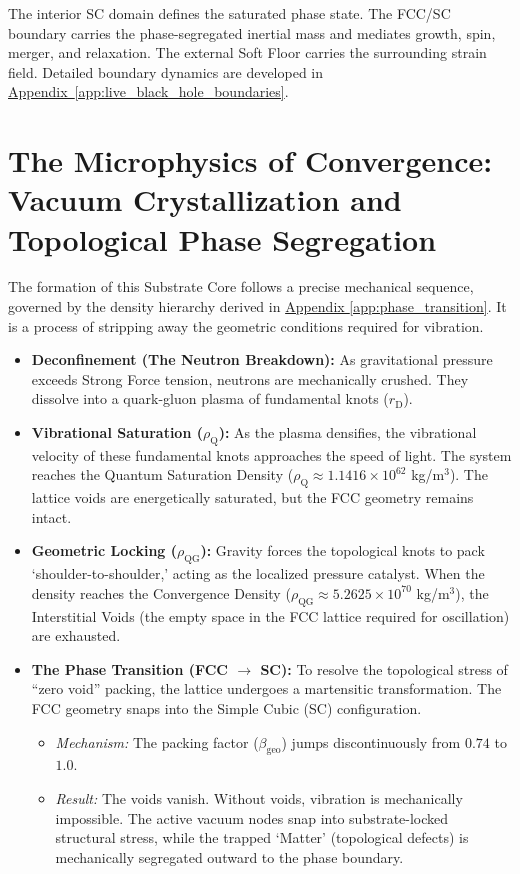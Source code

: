 The interior SC domain defines the saturated phase state. The FCC/SC boundary carries the phase-segregated inertial mass and mediates growth, spin, merger, and relaxation. The external Soft Floor carries the surrounding strain field. Detailed boundary dynamics are developed in \hyperref[app:live_black_hole_boundaries]{Appendix~\ref*{app:live_black_hole_boundaries}}.

\section{The Microphysics of Convergence: Vacuum Crystallization and Topological Phase Segregation}
\label{sec:matter_to_substrate}
The formation of this Substrate Core follows a precise mechanical sequence, governed by the density hierarchy derived in \hyperref[app:phase_transition]{Appendix \ref*{app:phase_transition}}. It is a process of stripping away the geometric conditions required for vibration.

\begin{itemize}
    \item \textbf{Deconfinement (The Neutron Breakdown):} As gravitational pressure exceeds Strong Force tension, neutrons are mechanically crushed. They dissolve into a quark-gluon plasma of fundamental knots ($r_{\mathrm{D}}$).
    \item \textbf{Vibrational Saturation ($\rho_{\mathrm{Q}}$):} As the plasma densifies, the vibrational velocity of these fundamental knots approaches the speed of light. The system reaches the Quantum Saturation Density ($\rho_{\mathrm{Q}} \approx 1.1416 \times 10^{62}$ kg/m$^3$). The lattice voids are energetically saturated, but the FCC geometry remains intact.
    \item \textbf{Geometric Locking ($\rho_{\mathrm{QG}}$):} Gravity forces the topological knots to pack `shoulder-to-shoulder,' acting as the localized pressure catalyst. When the density reaches the Convergence Density ($\rho_{\mathrm{QG}} \approx 5.2625 \times 10^{70}$ kg/m$^3$), the Interstitial Voids (the empty space in the FCC lattice required for oscillation) are exhausted.
    \item \textbf{The Phase Transition (FCC $\to$ SC):} To resolve the topological stress of ``zero void'' packing, the lattice undergoes a martensitic transformation. The FCC geometry snaps into the Simple Cubic (SC) configuration.
        \begin{itemize}
            \item \textit{Mechanism:} The packing factor ($\beta_{\mathrm{geo}}$) jumps discontinuously from $0.74$ to $1.0$.
            \item \textit{Result:} The voids vanish. Without voids, vibration is mechanically impossible. The active vacuum nodes snap into substrate-locked structural stress, while the trapped `Matter' (topological defects) is mechanically segregated outward to the phase boundary.
        \end{itemize}
\end{itemize}

